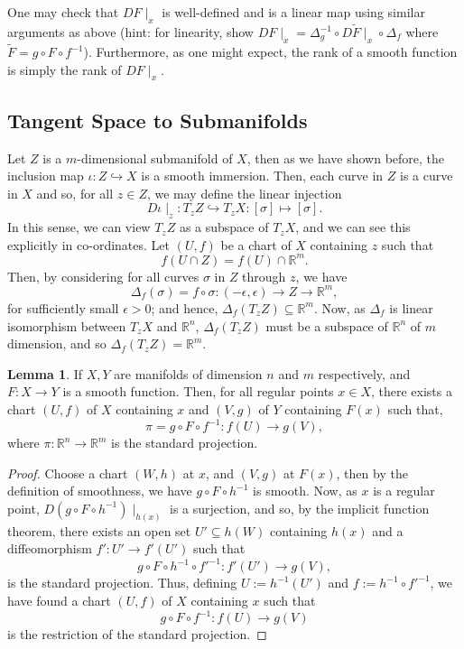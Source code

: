 \documentclass[]{article}
\theoremstyle{definition}
\theoremstyle{definition}
\newtheorem{lemma}{Lemma}[section]
\begin{document}
One may check that \(DF\mid_x\) is well-defined and is a linear map using 
similar arguments as above (hint: for linearity, show \(DF\mid_x = 
\Delta_g^{-1} \circ D\tilde F\mid_x \circ \Delta_f\) where 
\(\tilde F = g \circ F \circ f^{-1}\)). Furthermore, as one might expect, 
the rank of a smooth function is simply the rank of \(DF\mid_x\).

\subsection{Tangent Space to Submanifolds}

Let \(Z\) is a \(m\)-dimensional submanifold of \(X\), then as we have shown 
before, the inclusion map \(\iota : Z \hookrightarrow X\) is a smooth immersion. 
Then, each curve in \(Z\) is a curve in \(X\) and so, for all \(z \in Z\), 
we may define the linear injection 
\[D\iota\mid_z : T_z Z \hookrightarrow T_z X : [\sigma] \mapsto [\sigma].\]
In this sense, we can view \(T_z Z\) as a subspace of \(T_z X\), and we can 
see this explicitly in co-ordinates. Let \((U, f)\) be a chart of \(X\) containing 
\(z\) such that 
\[f(U \cap Z) = f(U) \cap \mathbb{R}^m.\]
Then, by considering for all curves \(\sigma\) in \(Z\) through \(z\), we have 
\[\Delta_f(\sigma) = f \circ \sigma : (-\epsilon, \epsilon) \to Z \to \mathbb{R}^m,\]
for sufficiently small \(\epsilon > 0\); and hence, 
\(\Delta_f(T_z Z) \subseteq \mathbb{R}^m\). Now, as \(\Delta_f\) is linear 
isomorphism between \(T_z X\) and \(\mathbb{R}^n\), \(\Delta_f(T_z Z)\) must be 
a subspace of \(\mathbb{R}^n\) of \(m\) dimension, and so 
\(\Delta_f(T_z Z) = \mathbb{R}^m\).

\begin{lemma}
  If \(X, Y\) are manifolds of dimension \(n\) and \(m\) respectively, and
  \(F : X \to Y\) is a smooth function. Then, for all regular points \(x \in X\), 
  there exists a chart \((U, f)\) of \(X\) containing \(x\) and \((V, g)\) of 
  \(Y\) containing \(F(x)\) such that, 
  \[\pi = g \circ F \circ f^{-1} : f(U) \to g(V),\]
  where \(\pi : \mathbb{R}^n \to \mathbb{R}^m\) is the standard projection.
\end{lemma}
\begin{proof}
  Choose a chart \((W, h)\) at \(x\), and \((V, g)\) at \(F(x)\), then by 
  the definition of smoothness, we have \(g \circ F \circ h^{-1}\) is smooth. 
  Now, as \(x\) is a regular point, \(D(g \circ F \circ h^{-1})\mid_{h(x)}\) is a 
  surjection, and so, by the implicit function theorem, there exists an open set 
  \(U' \subseteq h(W)\) containing \(h(x)\) and a diffeomorphism 
  \(f' : U' \to f'(U')\) such that 
  \[g \circ F \circ h^{-1} \circ f'^{-1} : f'(U') \to g(V),\]
  is the standard projection. Thus, defining \(U := h^{-1}(U')\) and 
  \(f := h^{-1} \circ f'^{-1}\), we have found a chart \((U, f)\) of \(X\) 
  containing \(x\) such that 
  \[g \circ F \circ f^{-1} : f(U) \to g(V)\]
  is the restriction of the standard projection.
\end{proof}
\end{document}
